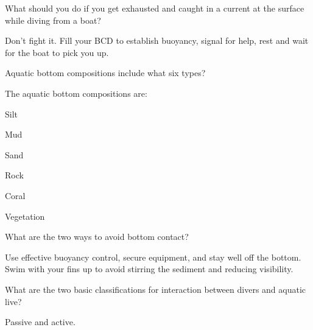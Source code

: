 	\begin{qanda}
		\begin{question}
What should you do if you get exhausted and caught in a current at the surface while diving from a boat?
		\end{question}

		\begin{answer}
Don't fight it.  Fill your BCD to establish buoyancy, signal for help, rest and wait for the boat to pick you up.
		\end{answer}
	\end{qanda}

	\begin{qanda}
		\begin{question}
Aquatic bottom compositions include what six types?
		\end{question}

		\begin{answer}
The aquatic bottom compositions are:
			\begin{nospacenumberedlist}
				\item Silt
				\item Mud
				\item Sand
				\item Rock
				\item Coral
				\item Vegetation
			\end{nospacenumberedlist}
		\end{answer}
	\end{qanda}

	\begin{qanda}
		\begin{question}
What are the two ways to avoid bottom contact?
		\end{question}

		\begin{answer}
Use effective buoyancy control, secure equipment, and stay well off the bottom.  Swim with your fins up to avoid stirring the sediment and reducing visibility.
		\end{answer}
	\end{qanda}

	\begin{qanda}
		\begin{question}
What are the two basic classifications for interaction between divers and aquatic live?
		\end{question}

		\begin{answer}
Passive and active.
		\end{answer}
	\end{qanda}

